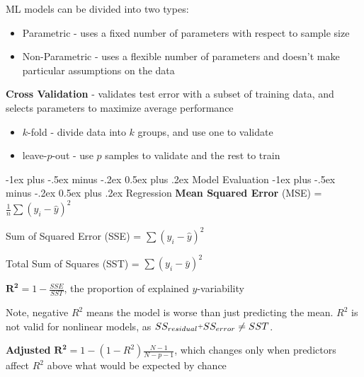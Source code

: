\documentclass[10pt,landscape]{article}
\makeatletter
\newcommand{\plus}{\raisebox{.3\height}{\scalebox{.7}{+}}}
\renewcommand{\section}{\@startsection{section}{1}{0mm}%
                                {-1ex plus -.5ex minus -.2ex}%
                                {0.5ex plus .2ex}%
                                {\normalfont\large\bfseries}}
\renewcommand{\subsection}{\@startsection{subsection}{2}{0mm}%
                                {-1ex plus -.5ex minus -.2ex}%
                                {0.5ex plus .2ex}%
                                {\normalfont\normalsize\bfseries}}
\makeatother
\begin{document}
\begin{multicols}{3}
    \vspace{.5mm}
    ML models can be divided into two types:
    \vspace{-.5mm}
    \begin{itemize}[label={--},leftmargin=4mm]
        \itemsep -.4mm
        \item Parametric - uses a fixed number of parameters with respect to sample size
        \item Non-Parametric - uses a flexible number of parameters and doesn't make particular assumptions on the data
    \end{itemize}

    \textbf{Cross Validation} - validates test error with a subset of training data, and selects parameters to maximize average performance
    \begin{itemize}[label={--},leftmargin=4mm]
        \itemsep -.4mm
              \vspace{-1mm}
        \item $k$-fold - divide data into $k$ groups, and use one to validate
        \item leave-$p$-out  - use $p$ samples to validate and the rest to train
    \end{itemize}

    \columnbreak
    \section{Model Evaluation}
    \subsection{Regression}
    \textbf{Mean Squared Error} (MSE) = $\frac{1}{n}\sum (y_i -\hat{y})^2$
    \vspace{.1em}

    Sum of Squared Error (SSE) = $\sum (y_i - \hat{y})^2$

    Total Sum of Squares (SST) = $\sum (y_i - \bar{y})^2$
    \vspace{.1em}

    $\boldsymbol{R^2} = 1 - \frac{SSE}{SST}$, the proportion of explained $y$-variability

    Note, negative $R^2$ means the model is worse than just predicting the mean. $R^2$ is not valid for nonlinear models, as $SS_{residual } \plus SS_{error} \neq SST$.


    \textbf{Adjusted} $\boldsymbol{R^2} = 1 - (1-R^2)\frac{N-1}{N-p-1}$, which changes only when predictors affect $R^2$ above what would be expected by chance\\



\end{multicols}
\end{document}
